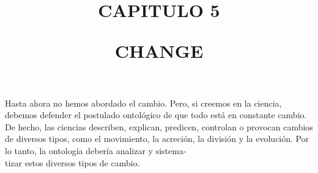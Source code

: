 \documentclass[11pt]{article}
\title{
  \normalsize CAPITULO 5
  \vspace{0.8cm}
  \begin{center}
    \large CHANGE
  \end{center}
  }
\date{}
\begin{document}
\maketitle
\vspace{-1cm}

\begin{justifying}
  \noindent 
  Hasta ahora no hemos abordado el cambio. Pero, si creemos en la ciencia, debemos defender el postulado ontológico de que todo 
  está en constante cambio. De hecho, las ciencias describen, explican, predicen, 
  controlan o provocan cambios de diversos tipos, como el movimiento, la acreción, 
  la división y la evolución. Por lo tanto, la ontología debería analizar y sistema- \\ tizar estos diversos tipos de cambio.
\end{justifying}










\printbibliography
\end{document}

